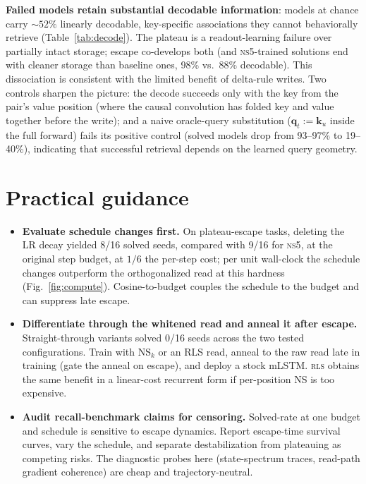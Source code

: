 \documentclass[11pt]{article}
\newcommand{\q}{\mathbf{q}}
\newcommand{\kk}{\mathbf{k}}
\newcommand{\ns}{\textsc{ns5}}
\begin{document}
\textbf{Failed models retain substantial decodable information}: models at
chance carry ${\sim}52\%$ linearly decodable, key-specific associations they
cannot behaviorally retrieve (Table~\ref{tab:decode}). The plateau is a
readout-learning failure over partially intact storage; escape co-develops both
(and \ns-trained solutions end with cleaner storage than baseline ones, 98\%
vs.\ 88\% decodable). This dissociation is consistent with the limited benefit of
delta-rule writes. Two controls sharpen the picture: the decode succeeds only
with the key from the pair's value position (where the causal convolution
has folded key and value together before the write); and a naive oracle-query
substitution ($\q_t:=\kk_u$ inside the full forward) fails its positive control
(solved models drop from 93--97\% to 19--40\%), indicating that successful retrieval
depends on the learned query geometry.

\section{Practical guidance}
\label{sec:guidance}

\begin{itemize}
\item \textbf{Evaluate schedule changes first.} On plateau-escape tasks,
  deleting the LR decay yielded 8/16 solved seeds, compared with 9/16 for \ns, at the original
  step budget, at $1/6$ the per-step cost; per unit wall-clock the
  schedule changes outperform the orthogonalized read at this hardness
  (Fig.~\ref{fig:compute}). Cosine-to-budget couples the schedule to the
  budget and can suppress late escape.
\item \textbf{Differentiate through the whitened read and anneal it after escape.}
  Straight-through variants solved 0/16 seeds across the two tested configurations.
  Train with $\mathrm{NS}_k$ or
  an RLS read, anneal to the raw read late in training (gate the anneal on
  escape), and deploy a stock mLSTM. \textsc{rls} obtains the same benefit in a
  linear-cost recurrent form if per-position NS is too expensive.
\item \textbf{Audit recall-benchmark claims for censoring.} Solved-rate at one
  budget and schedule is sensitive to escape dynamics. Report escape-time
  survival curves, vary the schedule, and separate destabilization from
  plateauing as competing risks. The diagnostic probes here (state-spectrum
  traces, read-path gradient coherence) are cheap and trajectory-neutral.
\end{itemize}
\end{document}

